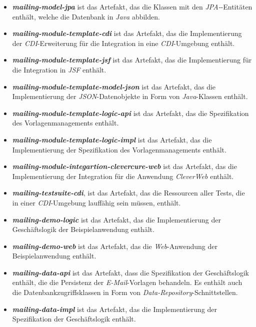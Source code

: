 \begin{itemize}
	\item\emph{\textbf{mailing-model-jpa}} 
	\newline
	ist das Artefakt, das die Klassen mit den \emph{JPA-}-Entitäten enthält, welche die Datenbank in \emph{Java} abbilden.
	\item\emph{\textbf{mailing-module-template-cdi}} 
	\newline
	ist das Artefakt, das die Implementierung der \emph{CDI}-Erweiterung für die Integration in eine \emph{CDI}-Umgebung  enthält.
	\item\emph{\textbf{mailing-module-template-jsf}}
	\newline
	ist das Artefakt, das die Implementierung für die Integration in \emph{JSF} enthält.
	\item\emph{\textbf{mailing-module-template-model-json}}
	\newline
	ist das Artefakt, das die Implementierung der \emph{JSON}-Datenobjekte in Form von \emph{Java}-Klassen enthält.	
	\item\emph{\textbf{mailing-module-template-logic-api}} 
	\newline
	ist das Artefakt, das die Spezifikation des Vorlagenmanagements enthält.
	\item\emph{\textbf{mailing-module-template-logic-impl}} 
	\newline
	ist das Artefakt, das die Implementierung der Spezifikation des Vorlagenmanagements enthält.
	\item\emph{\textbf{mailing-module-integartion-clevercure-web}}
	\newline
	ist das Artefakt, das die Implementierung der Integration für die Anwendung \emph{CleverWeb} enthält.
	\item\emph{\textbf{mailing-testsuite-cdi}},
	\newline
	ist das Artefakt, das die Ressourcen aller Tests, die in einer \emph{CDI}-Umgebung lauffähig sein müssen, enthält.
	\item\emph{\textbf{mailing-demo-logic}}
	\newline
	ist das Artefakt, das die Implementierung der Geschäftslogik der Beispielanwendung enthält.
	\item\emph{\textbf{mailing-demo-web}}
	\newline
	ist das Artefakt, das die \emph{Web}-Anwendung der Beispielanwendung enthält.
	\item\emph{\textbf{mailing-data-api}}
	\newline
	ist das Artefakt, dass die Spezifikation der Geschäftslogik enthält, die die Persistenz der \emph{E-Mail}-Vorlagen behandeln. Es enthält auch die Datenbankzugriffsklassen in Form von \emph{Data-Repository}-Schnittstellen.
	\item\emph{\textbf{mailing-data-impl}}
	\newline
	ist das Artefakt, das die Implementierung der Spezifikation der Geschäftslogik enthält.
\end{itemize} 

